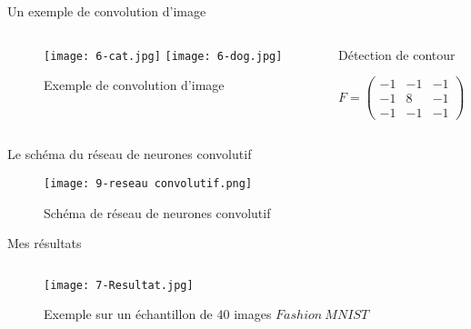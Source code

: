 \begin{frame}{Un exemple de convolution d'image}
    \begin{columns}[T] %
        \begin{column}{.6\textwidth}
            \begin{figure}
                \texttt{[image: 6-cat.jpg]}
                \texttt{[image: 6-dog.jpg]}
                \caption[]{Exemple de convolution d'image}
            \end{figure}
        \end{column}
        \begin{column}{0.35\textwidth}
            \begin{exampleblock}{Détection de contour}
                \begin{center}
                    \centering
                    $
                        F =
                        \begin{pmatrix}
                            -1 & -1 & -1 \\
                            -1 & 8  & -1 \\
                            -1 & -1 & -1
                        \end{pmatrix}
                    $
                \end{center}
            \end{exampleblock}
        \end{column}
    \end{columns}
\end{frame}


\begin{frame}{Le schéma du réseau de neurones convolutif}
    \begin{figure}
        \texttt{[image: 9-reseau convolutif.png]}
        \caption[]{Schéma de réseau de neurones convolutif}
    \end{figure}
\end{frame}

\begin{frame}{Mes résultats}
    \begin{columns}[T]
        \begin{column}{.75\textwidth}
            \begin{figure}
                \centering
                \texttt{[image: 7-Resultat.jpg]}
                \caption{Exemple sur un échantillon de 40 images $Fashion\ MNIST$}
            \end{figure}
        \end{column}
        \hfill
        \begin{column}{.25\textwidth}
            \bigskip	\bigskip	\bigskip
            
        \end{column}
    \end{columns}
\end{frame}
